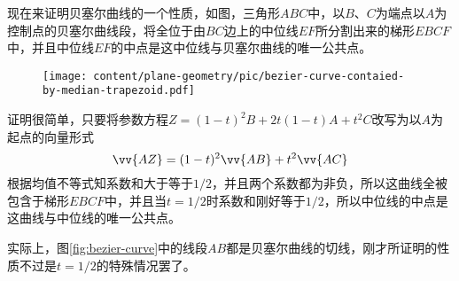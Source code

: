 \begin{example}
现在来证明贝塞尔曲线的一个性质，如图，三角形$ABC$中，以$B$、$C$为端点以$A$为控制点的贝塞尔曲线段，将全位于由$BC$边上的中位线$EF$所分割出来的梯形$EBCF$中，并且中位线$EF$的中点是这中位线与贝塞尔曲线的唯一公共点。

\begin{figure}[htbp]
\centering
\texttt{[image: content/plane-geometry/pic/bezier-curve-contaied-by-median-trapezoid.pdf]}
\caption{}
\label{fig:bezier-curve-contaied-by-median-trapezoid}
\end{figure}

证明很简单，只要将参数方程$Z = (1-t)^2B + 2t(1-t)A + t^2C$改写为以$A$为起点的向量形式
\begin{equation*}
  \vv{AZ} = (1-t)^2\vv{AB} + t^2 \vv{AC}
\end{equation*}
根据均值不等式知系数和大于等于$1/2$，并且两个系数都为非负，所以这曲线全被包含于梯形$EBCF$中，并且当$t=1/2$时系数和刚好等于$1/2$，所以中位线的中点是这曲线与中位线的唯一公共点。

实际上，图\ref{fig:bezier-curve}中的线段$AB$都是贝塞尔曲线的切线，刚才所证明的性质不过是$t=1/2$的特殊情况罢了。
\end{example}

